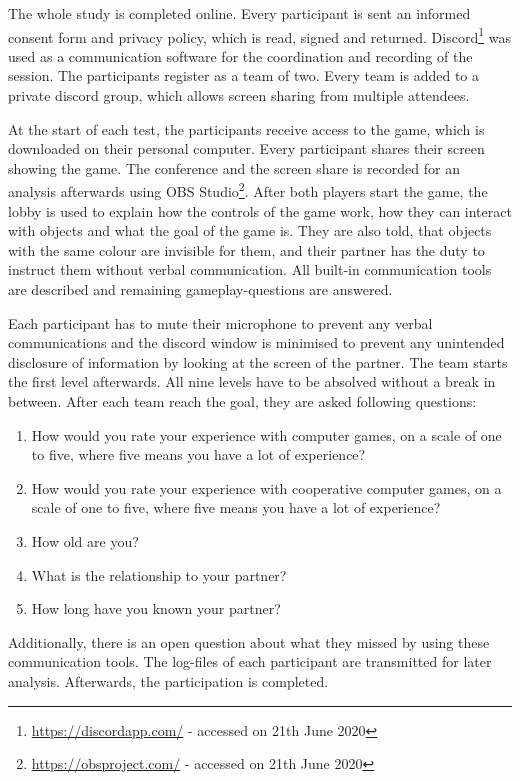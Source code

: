 The whole study is completed online.
Every participant is sent an informed consent form and privacy policy, which is read, signed and returned.
Discord\footnote{\url{https://discordapp.com/} - accessed on 21th June 2020} was used as a communication software for the coordination and recording of the session. The participants register as a team of two. 
Every team is added to a private discord group, which allows screen sharing from multiple attendees.

At the start of each test, the participants receive access to the game, which is downloaded on their personal computer.
Every participant shares their screen showing the game. The conference and the screen share is recorded for an analysis afterwards using OBS Studio\footnote{\url{https://obsproject.com/} - accessed on 21th June 2020}.
After both players start the game, the lobby is used to explain how the controls of the game work, how they can interact with objects and what the goal of the game is. They are also told, that objects with the same colour are invisible for them, and their partner has the duty to instruct them without verbal communication.
All built-in communication tools are described and remaining gameplay-questions are answered.

Each participant has to mute their microphone to prevent any verbal communications and the discord window is minimised to prevent any unintended disclosure of information by looking at the screen of the partner.
The team starts the first level afterwards. All nine levels have to be absolved without a break in between.
After each team reach the goal, they are asked following questions:

\begin{enumerate}
    \item How would you rate your experience with computer games, on a scale of one to five, where five means you have a lot of experience?
    \item How would you rate your experience with cooperative computer games, on a scale of one to five, where five means you have a lot of experience?
    \item How old are you?
    \item What is the relationship to your partner?
    \item How long have you known your partner?
\end{enumerate}

Additionally, there is an open question about what they missed by using these communication tools.
The log-files of each participant are transmitted for later analysis.
Afterwards, the participation is completed.

